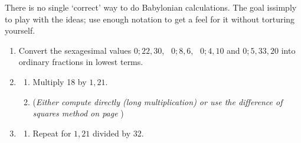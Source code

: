 \begin{exercises*}{}{}
There is no single `correct' way to do Babylonian calculations. The goal issimply to play with the ideas; use enough notation to get a feel for it without torturing yourself.

\begin{enumerate}%
  \item %
  Convert the sexagesimal values $0;22,30$, \ $0;8,6$, \ $0;4,10$ and $0;5,33,20$ into ordinary fractions in lowest terms.
  
  \item\begin{enumerate}%
    \item {}\lstsp Multiply 18 by $1,21$.
    \item[](\emph{Either compute directly (long multiplication) or use the difference of squares method on page \pageref{babmult}})
  \end{enumerate}
  
  
  \item\begin{enumerate}%
    \item {}\lstsp Repeat for $1,21$ divided by 32.
  \end{enumerate}
  
  


\end{enumerate}
\end{exercises*}
